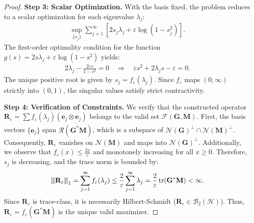 \documentclass[noinfoline]{imsart}\setcounter{tocdepth}{2}
\newcommand{\m}[1]{\mathbf{#1}}
\renewcommand{\c}[1]{\mathcal{#1}}
\DeclareMathOperator{\tr}{tr}
\newcommand{\vertii}[1]{{\vert\kern-0.25ex\vert\kern-0.25ex\vert #1 
    \vert\kern-0.25ex\vert\kern-0.25ex\vert}} %
\theoremstyle{plain}
\begin{document}
\begin{proof}
\noindent \textbf{Step 3: Scalar Optimization.} 
With the basis fixed, the problem reduces to a scalar optimization for each eigenvalue $\lambda_j$:
\begin{align*}
    \sup_{\{s_j\}} \sum_{j=1}^{\infty} \left[ 2 s_j \lambda_j + \varepsilon \log(1 - s_j^2) \right].
\end{align*}
The first-order optimality condition for the function $g(s) = 2 s \lambda_j + \varepsilon \log(1-s^{2})$ yields:
\begin{align*}
    2 \lambda_j - \frac{2 \varepsilon s}{1-s^{2}} = 0 \quad \Rightarrow \quad \varepsilon s^2 + 2\lambda_j s - \varepsilon = 0.
\end{align*}
The unique positive root is given by $s_j = f_{\varepsilon}(\lambda_j)$. Since $f_{\varepsilon}$ maps $(0, \infty)$ strictly into $(0, 1)$, the singular values satisfy strict contractivity.

\noindent\textbf{Step 4: Verification of Constraints.} 
We verify that the constructed operator $\m{R}_{\varepsilon} = \sum f_\varepsilon(\lambda_j) (\m{e}_j \otimes \m{e}_j)$ belongs to the valid set $\c{F}(\m{G}, \m{M})$. First, the basis vectors $\{\m{e}_j\}$ span $\overline{\c{R}(\m{G}^* \m{M})}$, which is a subspace of $\c{N}(\m{G})^\perp \cap \c{N}(\m{M})^\perp$. Consequently, $\m{R}_{\varepsilon}$ vanishes on $\c{N}(\m{M})$ and maps into $\c{N}(\m{G})^\perp$.
Additionally, we observe that $f_\varepsilon(x) \le \frac{2x}{\varepsilon}$ and monotonely increasing for all $x \ge 0$. Therefore, $s_{j}$ is decreasing, and the trace norm is bounded by:
\begin{align*}
    \vertii{\m{R}_{\varepsilon}}_1 = \sum_{j=1}^\infty f_\varepsilon(\lambda_j) \le \frac{2}{\varepsilon} \sum_{j=1}^\infty \lambda_j = \frac{2}{\varepsilon} \tr(\m{G}^* \m{M}) < \infty.
\end{align*}
Since $\m{R}_{\varepsilon}$ is trace-class, it is necessarily Hilbert-Schmidt ($\m{R}_{\varepsilon} \in \c{B}_2(\c{H})$).
Thus, $\m{R}_{\varepsilon} = f_{\varepsilon}(\m{G}^* \m{M})$ is the unique valid maximizer.
\end{proof}
\end{document}
